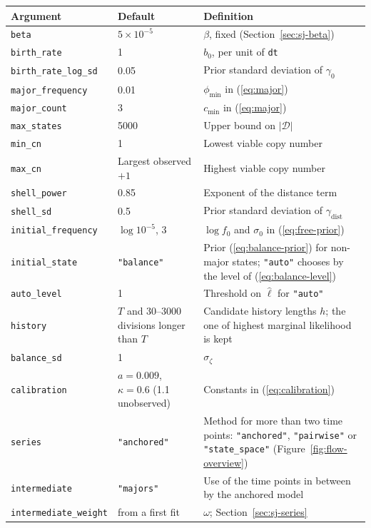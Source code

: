 \documentclass[11pt]{article}
\begin{document}
\begin{center}
\begin{tabular}{L{0.3\textwidth}L{0.22\textwidth}L{0.38\textwidth}}
\toprule
Argument & Default & Definition \\
\midrule
\texttt{beta} & $5\times10^{-5}$ & $\beta$, fixed (Section~\ref{sec:sj-beta}) \\
\texttt{birth\_rate} & 1 & $b_0$, per unit of \texttt{dt} \\
\texttt{birth\_rate\_log\_sd} & 0.05 & Prior standard deviation of $\gamma_0$ \\
\texttt{major\_frequency} & 0.01 & $\phi_{\min}$ in (\ref{eq:major}) \\
\texttt{major\_count} & 3 & $c_{\min}$ in (\ref{eq:major}) \\
\texttt{max\_states} & 5000 & Upper bound on $|\mathcal{D}|$ \\
\texttt{min\_cn} & 1 & Lowest viable copy number \\
\texttt{max\_cn} & Largest observed $+1$ & Highest viable copy number \\
\texttt{shell\_power} & 0.85 & Exponent of the distance term \\
\texttt{shell\_sd} & 0.5 & Prior standard deviation of $\gamma_{\mathrm{dist}}$ \\
\texttt{initial\_frequency} & $\log10^{-5}$, 3 & $\log f_0$ and $\sigma_0$ in (\ref{eq:free-prior}) \\
\texttt{initial\_state} & \texttt{"balance"} & Prior (\ref{eq:balance-prior}) for non-major states; \texttt{"auto"} chooses by the level of (\ref{eq:balance-level}) \\
\texttt{auto\_level} & 1 & Threshold on $\hat\ell$ for \texttt{"auto"} \\
\texttt{history} & $T$ and 30--3000 divisions longer than $T$ & Candidate
history lengths $h$; the one of highest marginal likelihood is kept \\
\texttt{balance\_sd} & 1 & $\sigma_\zeta$ \\
\texttt{calibration} & $a=0.009$, $\kappa=0.6$ (1.1 unobserved) & Constants in (\ref{eq:calibration}) \\
\texttt{series} & \texttt{"anchored"} & Method for more than two time points:
\texttt{"anchored"}, \texttt{"pairwise"} or \texttt{"state\_space"}
(Figure~\ref{fig:flow-overview}) \\
\texttt{intermediate} & \texttt{"majors"} & Use of the time points in between
by the anchored model \\
\texttt{intermediate\_weight} & from a first fit & $\omega$; Section~\ref{sec:sj-series} \\
\bottomrule
\end{tabular}
\end{center}
\end{document}
